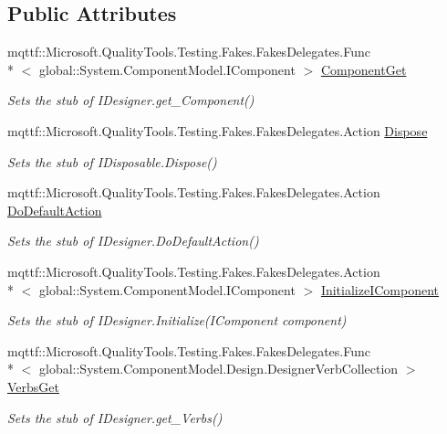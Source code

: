\subsection*{Public Attributes}
\begin{DoxyCompactItemize}
\item 
mqttf\-::\-Microsoft.\-Quality\-Tools.\-Testing.\-Fakes.\-Fakes\-Delegates.\-Func\\*
$<$ global\-::\-System.\-Component\-Model.\-I\-Component $>$ \hyperlink{class_system_1_1_component_model_1_1_design_1_1_fakes_1_1_stub_i_designer_a5ee56cde4104ac636ac73cc8ec248807}{Component\-Get}
\begin{DoxyCompactList}\small\item\em Sets the stub of I\-Designer.\-get\-\_\-\-Component()\end{DoxyCompactList}\item 
mqttf\-::\-Microsoft.\-Quality\-Tools.\-Testing.\-Fakes.\-Fakes\-Delegates.\-Action \hyperlink{class_system_1_1_component_model_1_1_design_1_1_fakes_1_1_stub_i_designer_a2a7c97bf85ad458edbc6245536c0fda6}{Dispose}
\begin{DoxyCompactList}\small\item\em Sets the stub of I\-Disposable.\-Dispose()\end{DoxyCompactList}\item 
mqttf\-::\-Microsoft.\-Quality\-Tools.\-Testing.\-Fakes.\-Fakes\-Delegates.\-Action \hyperlink{class_system_1_1_component_model_1_1_design_1_1_fakes_1_1_stub_i_designer_a8f5af437f4f6ce4a686666be9e4f5024}{Do\-Default\-Action}
\begin{DoxyCompactList}\small\item\em Sets the stub of I\-Designer.\-Do\-Default\-Action()\end{DoxyCompactList}\item 
mqttf\-::\-Microsoft.\-Quality\-Tools.\-Testing.\-Fakes.\-Fakes\-Delegates.\-Action\\*
$<$ global\-::\-System.\-Component\-Model.\-I\-Component $>$ \hyperlink{class_system_1_1_component_model_1_1_design_1_1_fakes_1_1_stub_i_designer_a8ba92f3d5c85ba391e196060c637d3e3}{Initialize\-I\-Component}
\begin{DoxyCompactList}\small\item\em Sets the stub of I\-Designer.\-Initialize(\-I\-Component component)\end{DoxyCompactList}\item 
mqttf\-::\-Microsoft.\-Quality\-Tools.\-Testing.\-Fakes.\-Fakes\-Delegates.\-Func\\*
$<$ global\-::\-System.\-Component\-Model.\-Design.\-Designer\-Verb\-Collection $>$ \hyperlink{class_system_1_1_component_model_1_1_design_1_1_fakes_1_1_stub_i_designer_a99505d97e63bd13cba1fffdad5948f73}{Verbs\-Get}
\begin{DoxyCompactList}\small\item\em Sets the stub of I\-Designer.\-get\-\_\-\-Verbs()\end{DoxyCompactList}\end{DoxyCompactItemize}


